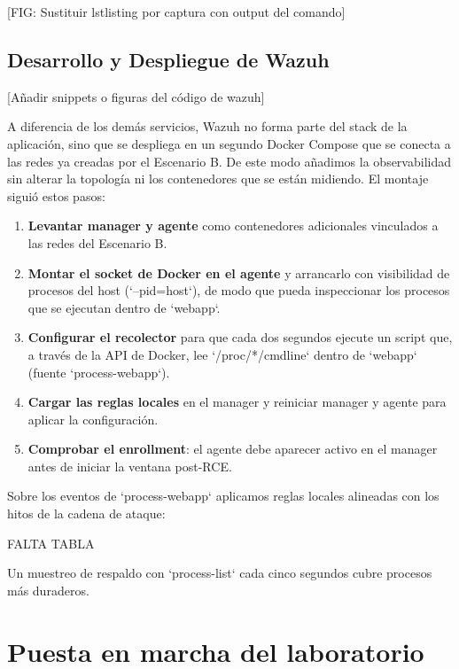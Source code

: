 \documentclass[11pt,spanish,listoffigures,listoftables]{tfgetsinf}
\begin{document}
        [FIG: Sustituir lstlisting por captura con output del comando]
        
        \subsection{Desarrollo y Despliegue de Wazuh}
        \label{sec:5.3.4}

        [Añadir snippets o figuras del código de wazuh]

        A diferencia de los demás servicios, Wazuh no forma parte del stack de la aplicación, sino que se despliega en un segundo Docker Compose que se conecta a las redes ya creadas por el Escenario B. De este modo añadimos la observabilidad sin alterar la topología ni los contenedores que se están midiendo. El montaje siguió estos pasos:
        \begin{enumerate}
            \item \textbf{Levantar manager y agente} como contenedores adicionales vinculados a las redes del Escenario B.
            \item \textbf{Montar el socket de Docker en el agente} y arrancarlo con visibilidad de procesos del host (`--pid=host`), de modo que pueda inspeccionar los procesos que se ejecutan dentro de `webapp`.
            \item \textbf{Configurar el recolector} para que cada dos segundos ejecute un script que, a través de la API de Docker, lee `/proc/*/cmdline` dentro de `webapp` (fuente `process-webapp`).
            \item \textbf{Cargar las reglas locales} en el manager y reiniciar manager y agente para aplicar la configuración.
            \item \textbf{Comprobar el enrollment}: el agente debe aparecer activo en el manager antes de iniciar la ventana post-RCE.
        \end{enumerate}
        
        Sobre los eventos de `process-webapp` aplicamos reglas locales alineadas con los hitos de la cadena de ataque:

        FALTA TABLA

        Un muestreo de respaldo con `process-list` cada cinco segundos cubre procesos más duraderos.

    \section{Puesta en marcha del laboratorio}
    \label{sec:5.4}
    
\end{document}
